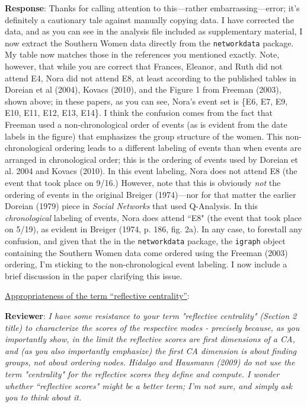 \documentclass{article}
\begin{document}
\textbf{Response}: Thanks for calling attention to this---rather embarrassing---error; it's definitely a cautionary tale against manually copying data. I have corrected the data, and as you can see in the analysis file included as supplementary material, I now extract the Southern Women data directly from the \texttt{networkdata} package. My table now matches those in the references you mentioned exactly. Note, however, that while you are correct that Frances, Eleanor, and Ruth did not attend E4, Nora did not attend E8, at least according to the published tables in Doreian et al (2004), Kovacs (2010), and the Figure 1 from Freeman (2003), shown above; in these papers, as you can see, Nora's event set is \{E6, E7, E9, E10, E11, E12, E13, E14\}. I think the confusion comes from the fact that Freeman used a non-chronological order of events (as is evident from the date labels in the figure) that emphasizes the group structure of the women. This non-chronological ordering leads to a different labeling of events than when events are arranged in chronological order; this is the ordering of events used by Doreian et al. 2004 and Kovacs (2010). In this event labeling, Nora does not attend E8 (the event that took place on 9/16.) However, note that this is obviously \textit{not} the ordering of events in the original Breiger (1974)---nor for that matter the earlier Doreian (1979) piece in \textit{Social Networks} that used Q-Analysis. In this \textit{chronological} labeling of events, Nora does attend ``E8" (the event that took place on 5/19), as evident in Breiger (1974, p. 186, fig. 2a). In any case, to forestall any confusion, and given that the in the \texttt{networkdata} package, the \texttt{igraph} object containing the Southern Women data come ordered using the Freeman (2003) ordering, I'm sticking to the non-chronological event labeling. I now include a brief discussion in the paper clarifying this issue. 

\underline{Appropriateness of the term ``reflective centrality''}:

\textbf{Reviewer}: \textit{I have some resistance to your term "reflective centrality" (Section 2 title) to characterize the scores of the respective modes - precisely because, as you importantly show, in the limit the reflective scores are first dimensions of a CA, and (as you also importantly emphasize) the first CA dimension is about finding groups, not about ordering nodes. Hidalgo and Hausmann (2009) do not use the term "centrality" for the reflective scores they define and compute. I wonder whether ``reflective scores" might be a better term; I'm not sure, and simply ask you to think about it.}
\end{document}
